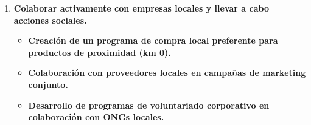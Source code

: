 \begin{solution}
\begin{enumerate}[label=\alph*)]
			\begin{itemize}

				\item \textbf{Implementación de un sistema de economía circular: reutilización de embalajes, palés y materiales.}
				\item \textbf{Programa de separación y reciclaje de residuos orgánicos, plásticos, cartón y otros materiales.}
				\item \textbf{Donación sistemática de excedentes alimentarios aptos para el consumo a bancos de alimentos.}
				
			\end{itemize}


		\item \textbf{Colaborar activamente con empresas locales y llevar a cabo acciones sociales.}

			\begin{itemize}

				\item \textbf{Creación de un programa de compra local preferente para productos de proximidad (km 0).}
				\item \textbf{Colaboración con proveedores locales en campañas de marketing conjunto.}
				\item \textbf{Desarrollo de programas de voluntariado corporativo en colaboración con ONGs locales.}
				
			\end{itemize}



	\end{enumerate}
\end{solution}

